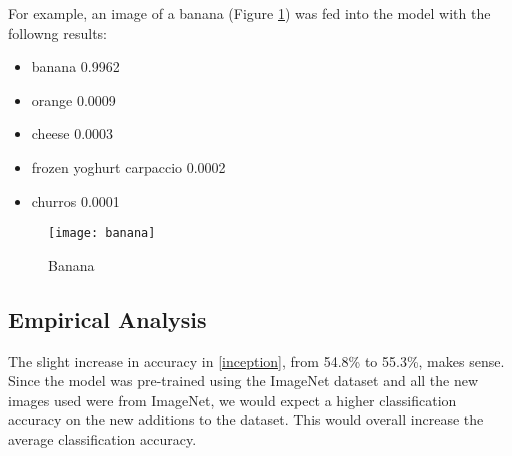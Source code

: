 For example, an image of a banana (Figure \ref{fig:banana}) was fed into the model with
the followng results:
\begin{itemize}
    \item{banana 0.9962}
    \item{orange 0.0009}
    \item{cheese 0.0003}
    \item{frozen yoghurt carpaccio 0.0002}
    \item{churros 0.0001}
\end{itemize}
 
\begin{figure}
    \texttt{[image: banana]}
    \caption{Banana}
    \label{fig:banana}
\end{figure}

\subsection*{Empirical Analysis}
The slight increase in accuracy in \ref{inception}, from 54.8\% to 55.3\%, makes
sense. Since the model was pre-trained using the ImageNet dataset and all the
new images used were from ImageNet, we would expect a higher classification
accuracy on the new additions to the dataset. This would overall increase the
average classification accuracy.
